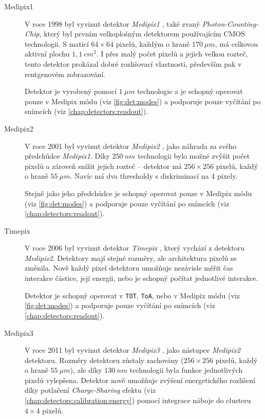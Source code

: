 \begin{description}

	\item[Medipix1] V roce 1998 byl vyvinut detektor \textit{Medipix1} \cite{medipix1}, také zvaný \textit{Photon-Counting-Chip}, který byl prvním velkoplošným detektorem používajícím CMOS technologii. S maticí $64\times64$ pixelů, každým o hraně $170~\mu m$, má celkovou aktivní plochu $1,1~cm^2$. I přes malý počet pixelů a jejich velkou rozteč, tento detektor prokázal dobré rozlišovací vlastnosti, především pak v rentgenovém zobrazování. 
	
	Detektor je vyrobený pomocí $1~\mu m$ technologie a je schopný operovat pouze v Medipix módu (viz \ref{fig:det:modes}) a podporuje pouze vyčítání po snímcích (viz \ref{chap:detectors:readout}).
	
	\item[Medipix2] V roce 2001 byl vyvinut detektor \textit{Medipix2} \cite{medipix2}, jako náhrada za svého předchůdce \textit{Medipix1}. Díky $250~nm$ technologii bylo možné zvýšit počet pixelů a zároveň snížit jejich rozteč -- detektor má $256\times256$ pixelů, každý o hraně $55~\mu m$. Navíc má dva thresholdy s diskriminací na 4 pixely. 
	
	Stejně jako jeho předchůdce je schopný operovat pouze v Medipix módu (viz \ref{fig:det:modes}) a podporuje pouze vyčítání po snímcích (viz \ref{chap:detectors:readout}).
	
	\item[Timepix]\label{chap:detectors:medipix_overview:timepix} V roce 2006 byl vyvinut detektor \textit{Timepix} \cite{timepix}, který vychází z detektoru \textit{Medipix2}. Detektory mají stejné rozměry, ale architektura pixelů se změnila. Nově každý pixel detektoru umožňuje nezávisle měřit čas interakce částice, její energii, nebo je schopný počítat jednotlivé interakce. 
	
	Detektor je schopný operovat v \texttt{TOT}, \texttt{ToA}, nebo v Medipix módu (viz \ref{fig:det:modes}) a podporuje pouze vyčítání po snímcích (viz \ref{chap:detectors:readout}).
	
	\item[Medipix3] V roce 2011 byl vyvinut detektor \textit{Medipix3} \cite{medipix3}, jako nástupce \textit{Medipix2} detektoru. Rozměry detektoru zůstaly zachovány ($256\times256$ pixelů, každý o hraně $55~\mu m$), ale díky $130~nm$ technologii byla funkce jednotlivých pixelů vylepšena. Detektor nově umožňuje zvýšení energetického rozlišení díky potlačení \textit{Charge-Sharing} efektu (viz \ref{chap:detectors:calibration:energy}) pomocí integrace náboje do clusteru $4\times4$ pixelů. 
	

\end{description}
